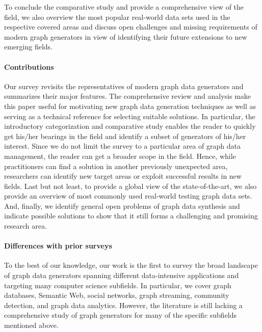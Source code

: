 To conclude the comparative study and provide a comprehensive view of the
field,  we also overview the most popular real-world data sets used in the respective covered areas and discuss open challenges and missing requirements of modern
graph generators in view of identifying their future extensions to new emerging fields.


\paragraph*{Contributions} Our survey revisits the representatives of
modern graph data generators and summarizes their major features. The comprehensive review and analysis make this paper useful for motivating new graph data generation techniques as well as serving as a technical reference for selecting suitable solutions. In particular, the introductory categorization and comparative study enables the reader to quickly get his/her bearings in the field and identify a subset of generators of his/her interest. Since we do not limit the survey to a particular area of graph data management,  the reader can get a broader scope in the field. Hence, while practitioners can find a solution in another previously unexpected area, researchers can identify new target areas or exploit successful results in new fields. Last but not least, to provide a global view of the state-of-the-art, we also provide an overview of most commonly used real-world testing graph data sets. And, finally, we identify general open problems of graph data synthesis and indicate possible solutions to show that it still forms a challenging and promising research area.

\paragraph*{Differences with prior surveys}

To the best of our knowledge, our work is the first to survey the broad
landscape of graph data generators spanning different data-intensive applications and
targeting many computer science subfields. In particular, we cover graph databases, Semantic Web, social networks, graph streaming, community detection, and graph data analytics. However, the literature is still lacking a comprehensive study of graph generators  for many of the specific subfields mentioned above.

